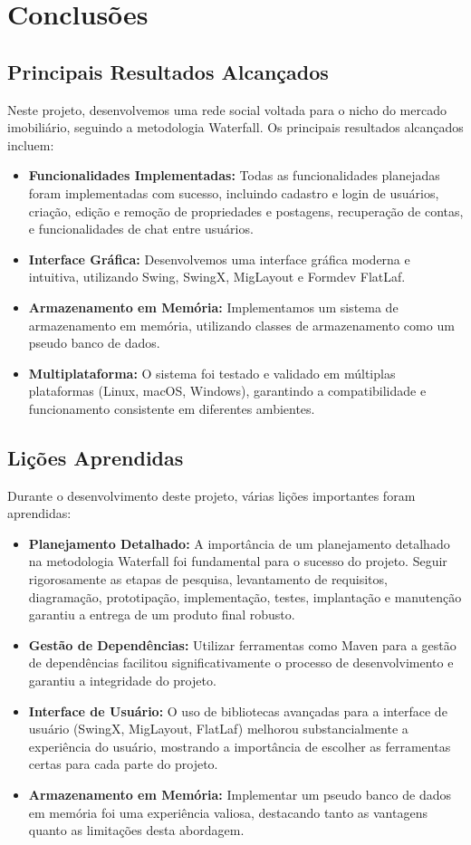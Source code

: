 \documentclass[../main.tex]{subfiles}
\begin{document}
\section{Conclusões}

\subsection{Principais Resultados Alcançados}
Neste projeto, desenvolvemos uma rede social voltada para o nicho do mercado imobiliário, seguindo a metodologia Waterfall. Os principais resultados alcançados incluem:

\begin{itemize}
    \item \textbf{Funcionalidades Implementadas:} Todas as funcionalidades planejadas foram implementadas com sucesso, incluindo cadastro e login de usuários, criação, edição e remoção de propriedades e postagens, recuperação de contas, e funcionalidades de chat entre usuários.
    \item \textbf{Interface Gráfica:} Desenvolvemos uma interface gráfica moderna e intuitiva, utilizando Swing, SwingX, MigLayout e Formdev FlatLaf.
    \item \textbf{Armazenamento em Memória:} Implementamos um sistema de armazenamento em memória, utilizando classes de armazenamento como um pseudo banco de dados.
    \item \textbf{Multiplataforma:} O sistema foi testado e validado em múltiplas plataformas (Linux, macOS, Windows), garantindo a compatibilidade e funcionamento consistente em diferentes ambientes.
\end{itemize}

\subsection{Lições Aprendidas}
Durante o desenvolvimento deste projeto, várias lições importantes foram aprendidas:

\begin{itemize}
    \item \textbf{Planejamento Detalhado:} A importância de um planejamento detalhado na metodologia Waterfall foi fundamental para o sucesso do projeto. Seguir rigorosamente as etapas de pesquisa, levantamento de requisitos, diagramação, prototipação, implementação, testes, implantação e manutenção garantiu a entrega de um produto final robusto.
    \item \textbf{Gestão de Dependências:} Utilizar ferramentas como Maven para a gestão de dependências facilitou significativamente o processo de desenvolvimento e garantiu a integridade do projeto.
    \item \textbf{Interface de Usuário:} O uso de bibliotecas avançadas para a interface de usuário (SwingX, MigLayout, FlatLaf) melhorou substancialmente a experiência do usuário, mostrando a importância de escolher as ferramentas certas para cada parte do projeto.
    \item \textbf{Armazenamento em Memória:} Implementar um pseudo banco de dados em memória foi uma experiência valiosa, destacando tanto as vantagens quanto as limitações desta abordagem.
\end{itemize}
\end{document}
